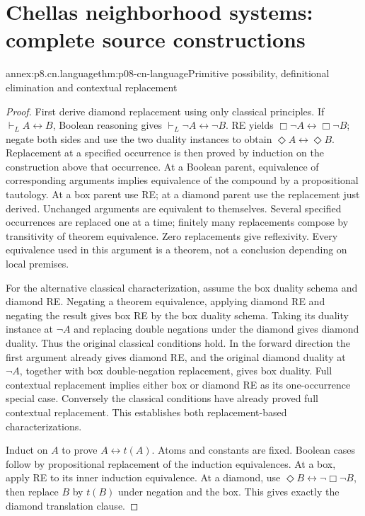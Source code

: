 \section{Chellas neighborhood systems: complete source constructions}

\begin{annexitem}{annex:p8.cn.language}{thm:p08-cn-language}{Primitive possibility, definitional elimination and contextual replacement}
\begin{proof}
First derive diamond replacement using only classical principles.
If \(\vdash_L A\leftrightarrow B\), Boolean reasoning gives
\(\vdash_L\neg A\leftrightarrow\neg B\). RE yields
\(\Box\neg A\leftrightarrow\Box\neg B\); negate both
sides and use the two duality instances to obtain
\(\Diamond A\leftrightarrow\Diamond B\).
Replacement at a specified occurrence is then proved by induction
on the construction above that occurrence. At a Boolean parent,
equivalence of corresponding arguments implies equivalence of the
compound by a propositional tautology. At a box parent use RE;
at a diamond parent use the replacement just derived. Unchanged
arguments are equivalent to themselves. Several specified occurrences
are replaced one at a time; finitely many replacements compose by
transitivity of theorem equivalence. Zero replacements give reflexivity.
Every equivalence used in this argument is a theorem, not a conclusion
depending on local premises.

For the alternative classical characterization, assume the box
duality schema and diamond RE. Negating a theorem equivalence,
applying diamond RE and negating the result gives box RE by the
box duality schema. Taking its duality instance at \(\neg A\)
and replacing double negations under the diamond gives diamond
duality. Thus the original classical conditions hold. In the
forward direction the first argument already gives diamond RE,
and the original diamond duality at \(\neg A\), together
with box double-negation replacement, gives box duality.
Full contextual replacement implies either box or diamond RE
as its one-occurrence special case. Conversely the classical
conditions have already proved full contextual replacement.
This establishes both replacement-based characterizations.

Induct on \(A\) to prove \(A\leftrightarrow t(A)\).
Atoms and constants are fixed. Boolean cases follow by propositional
replacement of the induction equivalences. At a box, apply RE to its
inner induction equivalence. At a diamond, use
\(\Diamond B\leftrightarrow\neg\Box\neg B\), then
replace \(B\) by \(t(B)\) under negation and the box. This gives
exactly the diamond translation clause.


\end{proof}
\end{annexitem}
